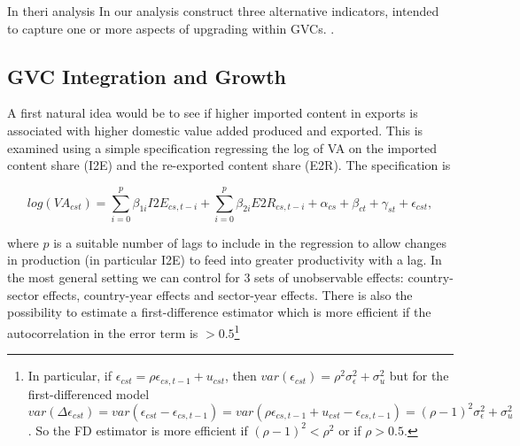 \documentclass[a4paper]{article}
\begin{document}
In theri analysis In our analysis \citet{foster2015global} construct three alternative indicators, intended to capture one or more aspects of upgrading within GVCs. 
. 




\subsection{GVC Integration and  Growth}

A first natural idea would be to see if higher imported content in exports is associated with higher domestic value added produced and exported. This is examined using a simple specification regressing the log of VA on the imported content share (I2E) and the re-exported content share (E2R). The specification is

\begin{equation} \label{eq:GROWTH_HDFE}
log(VA_{cst}) = \sum_{i=0}^p \beta_{1i} I2E_{cs,t-i} + \sum_{i = 0}^p \beta_{2i} E2R_{cs,t-i}  + \alpha_{cs} + \beta_{ct} +\gamma_{st} + \epsilon_{cst},
\end{equation}

where $p$ is a suitable number of lags to include in the regression to allow changes in production (in particular I2E) to feed into greater productivity with a lag. In the most general setting we can control for 3 sets of unobservable effects: country-sector effects, country-year effects and sector-year effects. There is also the possibility to estimate a first-difference estimator which is more efficient if the autocorrelation in the error term is $> 0.5$\footnote{In particular, if $\epsilon_{cst} = \rho \epsilon_{cs,t-1} + u_{cst}$, then $var(\epsilon_{cst}) = \rho^2 \sigma^2_\epsilon + \sigma^2_u$ but for the first-differenced model $var(\Delta \epsilon_{cst}) = var(\epsilon_{cst} - \epsilon_{cs,t-1}) = var(\rho \epsilon_{cs,t-1} + u_{cst} - \epsilon_{cs,t-1}) = (\rho-1)^2 \sigma^2_\epsilon + \sigma^2_u$. So the FD estimator is more efficient if $(\rho-1)^2<\rho^2$ or if $\rho > 0.5$. } 
\end{document}

